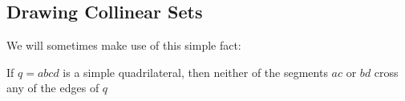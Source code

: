 \documentclass{patmorin}
\begin{document}
%
%

\subsection{Drawing Collinear Sets}


We will sometimes make use of this simple fact:
\begin{obs}
  If $q=abcd$ is a simple quadrilateral, then neither of the segments $ac$
  or $bd$ cross any of the edges of $q$
\end{obs}
\end{document}
